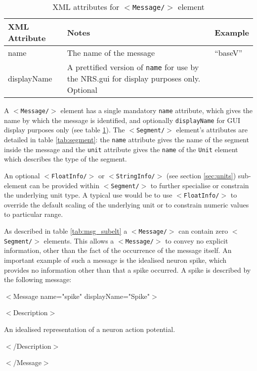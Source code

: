 \documentclass[pdftex,a4paper]{article}
\newcommand{\XML}[2][]{{\tt \small $<$#2#1/$>$}}
\newcommand{\XMLfont}[1]{{\tt \small #1}}
\newcommand{\XMLtext}[1]{
  \begin{tt}
    \begin{small}
      \begin{list}{}{
          \setlength{\topsep}{0pt}
          \setlength{\partopsep}{0pt}
          \setlength{\itemsep}{0pt}
          \setlength{\parsep}{0pt}
          \setlength{\leftmargin}{2em}
          \setlength{\rightmargin}{2em}
          \setlength{\labelsep}{0pt}
        }
      \item #1
      \end{list}
    \end{small}
  \end{tt}
}
\newcommand{\XMLfull}[3][]{\XMLtext{$<$#2#1$>$
    #3
  \item $<$/#2$>$}}
\begin{document}
\begin{table}[!h]
  \begin{center}
    \caption{XML attributes for \XML{Message} element}
    \label{tab:message}
    \begin{tabular}{|l|p{6cm}|p{3cm}|}
      \hline

      \textbf{XML Attribute} & \textbf{Notes} & \textbf{Example}\\

      \hline

      name & The name of the message &``baseV''\\

      \hline

      displayName & A prettified version of \XMLfont{name} for use by
      the NRS.gui for display purposes only. Optional & \\

      \hline

    \end{tabular}
  \end{center}
\end{table}

A \XML{Message} element has a single mandatory \XMLfont{name}
attribute, which gives the name by which the message is identified,
and optionally \XMLfont{displayName} for GUI display purposes only
(see table \ref{tab:message}). The \XML{Segment} element's attributes
are detailed in table \ref{tab:segment}: the \XMLfont{name} attribute
gives the name of the segment inside the message and the
\XMLfont{unit} attribute gives the \XMLfont{name} of the
\XMLfont{Unit} element which describes the type of the segment.

An optional \XML{FloatInfo} or \XML{StringInfo} (see section
\ref{sec:units}) sub-element can be provided within \XML{Segment} to
further specialise or constrain the underlying unit type. A typical use
would be to use \XML{FloatInfo} to override the default scaling of the
underlying unit or to constrain numeric values to particular range.

As described in table \ref{tab:msg_subelt} a \XML{Message} can
contain zero \XML{Segment} elements. This allows a \XML{Message} to
convey no explicit information, other than the fact of the occurrence of
the message itself. An important example of such a message is the
idealised neuron spike, which provides no information other than that a
spike occurred. A spike is described by the following message:


\XMLfull[ name="spike" displayName="Spike"]{Message}{
  \XMLfull{Description}{
    \XMLtext{An idealised representation of a neuron action potential.}
  }
}
\end{document}
